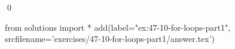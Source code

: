 
\begin{ex}
  \label{ex:47-10-for-loops-part1}
  
  \qed
\end{ex}
\begin{python0}
from solutions import *
add(label="ex:47-10-for-loops-part1",
    srcfilename='exercises/47-10-for-loops-part1/answer.tex')
\end{python0}
